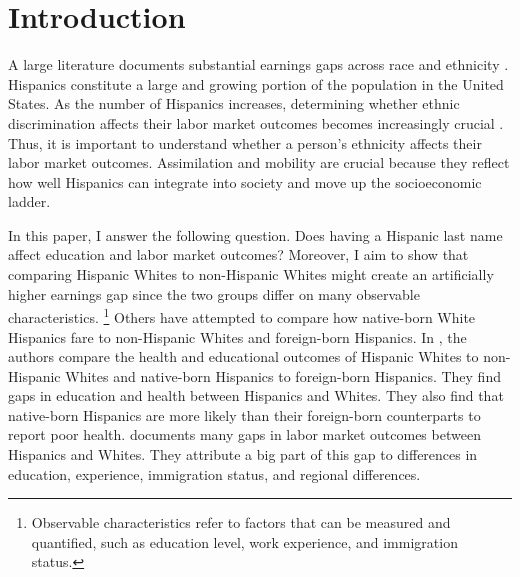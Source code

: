 \documentclass[a4paper,fleqn]{cas-sc}
\begin{document}

\section{Introduction}

A large literature documents substantial earnings gaps across race and ethnicity \citep{bayer2018divergent, charles2008prejudice, card1992school, fryer2004causes, rubinstein2014pride, bertrand2004emily, juhn1991accounting}. Hispanics constitute a large and growing portion of the population in the United States. As the number of Hispanics increases, determining whether ethnic discrimination affects their labor market outcomes becomes increasingly crucial \citep{chettyUnitedStatesStill2014, chettyEffectsExposureBetter2016,chettyFadingAmericanDream2017,abramitzkyImmigrantsAssimilateMore2020a, abramitzkyNationImmigrantsAssimilation2014,abramitzkyCulturalAssimilationAge2016,chettyWhereLandOpportunity2014}. Thus, it is important to understand whether a person's ethnicity affects their labor market outcomes. Assimilation and mobility are crucial because they reflect how well Hispanics can integrate into society and move up the socioeconomic ladder.

In this paper, I answer the following question. Does having a Hispanic last name affect education and labor market outcomes? Moreover, I aim to show that comparing Hispanic Whites to non-Hispanic Whites might create an artificially higher earnings gap since the two groups differ on many observable characteristics. \footnote{Observable characteristics refer to factors that can be measured and quantified, such as education level, work experience, and immigration status.} Others have attempted to compare how native-born White Hispanics fare to non-Hispanic Whites and foreign-born Hispanics. In \citet{antman2020ethnic,antmanEthnicAttritionObserved2016,antmanEthnicAttritionObserved2016a,antmanEthnicAttritionAssimilation2020}, the authors compare the health and educational outcomes of Hispanic Whites to non-Hispanic Whites and native-born Hispanics to foreign-born Hispanics. They find gaps in education and health between Hispanics and Whites. They also find that native-born Hispanics are more likely than their foreign-born counterparts to report poor health. \citet{davilaChangesRelativeEarnings2008} documents many gaps in labor market outcomes between Hispanics and Whites. They attribute a big part of this gap to differences in education, experience, immigration status, and regional differences. 
\end{document}
